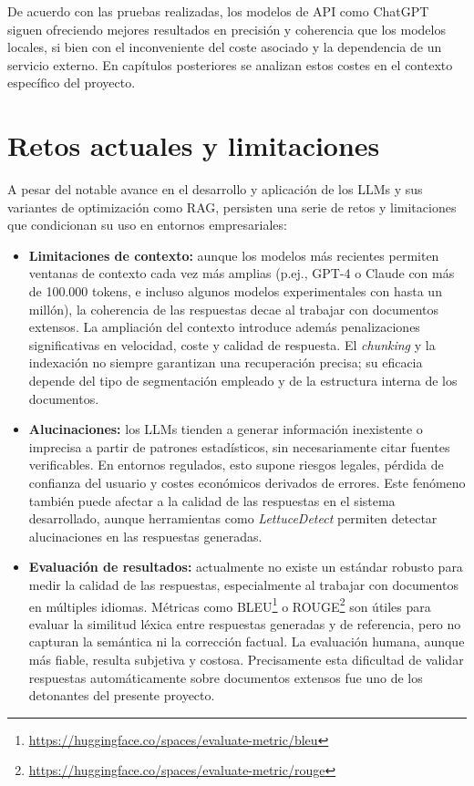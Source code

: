 De acuerdo con las pruebas realizadas, los modelos de API como ChatGPT siguen ofreciendo mejores resultados en precisión y coherencia que los modelos locales, si bien con el inconveniente del coste asociado y la dependencia de un servicio externo. En capítulos posteriores se analizan estos costes en el contexto específico del proyecto.

\section{Retos actuales y limitaciones}
A pesar del notable avance en el desarrollo y aplicación de los LLMs y sus variantes de optimización como RAG, persisten una serie de retos y limitaciones que condicionan su uso en entornos empresariales:

\begin{itemize}
    \item \textbf{Limitaciones de contexto:} aunque los modelos más recientes permiten ventanas de contexto cada vez más amplias (p.ej., GPT-4 o Claude con más de 100.000 tokens, e incluso algunos modelos experimentales con hasta un millón), la coherencia de las respuestas decae al trabajar con documentos extensos. La ampliación del contexto introduce además penalizaciones significativas en velocidad, coste y calidad de respuesta. El \textit{chunking} y la indexación no siempre garantizan una recuperación precisa; su eficacia depende del tipo de segmentación empleado y de la estructura interna de los documentos.

    \item \textbf{Alucinaciones:} los LLMs tienden a generar información inexistente o imprecisa a partir de patrones estadísticos, sin necesariamente citar fuentes verificables. En entornos regulados, esto supone riesgos legales, pérdida de confianza del usuario y costes económicos derivados de errores. Este fenómeno también puede afectar a la calidad de las respuestas en el sistema desarrollado, aunque herramientas como \textit{LettuceDetect} permiten detectar alucinaciones en las respuestas generadas.

    \item \textbf{Evaluación de resultados:} actualmente no existe un estándar robusto para medir la calidad de las respuestas, especialmente al trabajar con documentos en múltiples idiomas. Métricas como BLEU\footnote{\url{https://huggingface.co/spaces/evaluate-metric/bleu}} o ROUGE\footnote{\url{https://huggingface.co/spaces/evaluate-metric/rouge}} son útiles para evaluar la similitud léxica entre respuestas generadas y de referencia, pero no capturan la semántica ni la corrección factual. La evaluación humana, aunque más fiable, resulta subjetiva y costosa. Precisamente esta dificultad de validar respuestas automáticamente sobre documentos extensos fue uno de los detonantes del presente proyecto.


\end{itemize}
